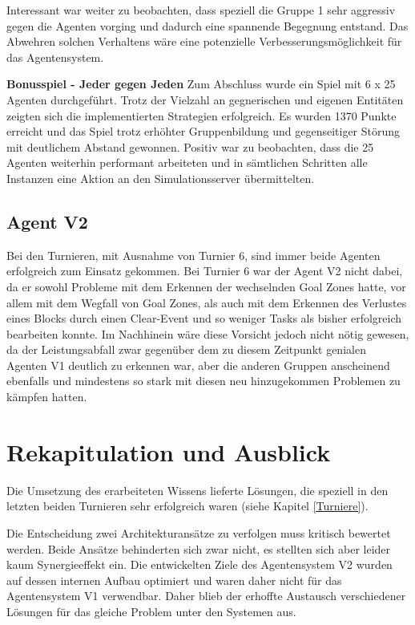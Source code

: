 \documentclass[runningheads]{llncs}
\begin{document}
Interessant war weiter zu beobachten, dass speziell die Gruppe 1 sehr aggressiv gegen die Agenten vorging und dadurch eine spannende Begegnung entstand. Das Abwehren solchen Verhaltens wäre eine potenzielle Verbesserungsmöglichkeit für das Agentensystem. 

\textbf{Bonusspiel - Jeder gegen Jeden}
Zum Abschluss wurde ein Spiel mit 6 x 25 Agenten durchgeführt. Trotz der Vielzahl an gegnerischen und eigenen Entitäten zeigten sich die implementierten Strategien erfolgreich. Es wurden 1370 Punkte erreicht und das Spiel trotz erhöhter Gruppenbildung und gegenseitiger Störung mit deutlichem Abstand gewonnen.
Positiv war zu beobachten, dass die 25 Agenten weiterhin performant arbeiteten und in sämtlichen Schritten alle Instanzen eine Aktion an den Simulationsserver übermittelten.

\subsection{Agent V2}
Bei den Turnieren, mit Ausnahme von Turnier 6, sind immer beide Agenten erfolgreich zum Einsatz gekommen. Bei Turnier 6 war der Agent V2 nicht dabei, da er sowohl Probleme mit dem Erkennen der wechselnden Goal Zones hatte, vor allem mit dem Wegfall von Goal Zones, als auch mit dem Erkennen des Verlustes eines Blocks durch einen Clear-Event und so weniger Tasks als bisher erfolgreich bearbeiten konnte. Im Nachhinein wäre diese Vorsicht jedoch nicht nötig gewesen, da der Leistungsabfall zwar gegenüber dem zu diesem Zeitpunkt genialen Agenten V1 deutlich zu erkennen war, aber die anderen Gruppen anscheinend ebenfalls und mindestens so stark mit diesen neu hinzugekommen Problemen zu kämpfen hatten.

\section{Rekapitulation und Ausblick}
Die Umsetzung des erarbeiteten Wissens lieferte Lösungen, die speziell in den letzten beiden Turnieren sehr erfolgreich waren (siehe Kapitel \ref{Turniere}).


Die Entscheidung zwei Architekturansätze zu verfolgen muss kritisch bewertet werden. Beide Ansätze behinderten sich zwar nicht, es stellten sich aber leider kaum Synergieeffekt ein. Die entwickelten Ziele des Agentensystem V2 wurden auf dessen internen Aufbau optimiert und waren daher nicht für das Agentensystem V1 verwendbar. Daher blieb der erhoffte Austausch verschiedener Lösungen für das gleiche Problem unter den Systemen aus.
\end{document}
